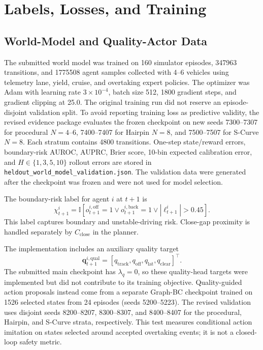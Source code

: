 \documentclass[journal]{IEEEtran}
\begin{document}
\section{Labels, Losses, and Training}
\label{supp:training}

\subsection{World-Model and Quality-Actor Data}
\label{supp:wm_training}

The submitted world model was trained on 160 simulator episodes,
347963 transitions, and 1775508 agent samples collected with 4--6
vehicles using telemetry lane, yield, cruise, and overtaking expert
policies. The optimizer was Adam with learning rate $3\times10^{-4}$,
batch size 512, 1800 gradient steps, and gradient clipping at 25.0.
The original training run did not reserve an episode-disjoint
validation split. To avoid reporting training loss as predictive
validity, the revised evidence package evaluates the frozen checkpoint
on new seeds 7300--7307 for procedural $N=4$--6, 7400--7407 for
Hairpin $N=8$, and 7500--7507 for S-Curve $N=8$. Each stratum contains
4800 transitions. One-step state/reward errors, boundary-risk AUROC,
AUPRC, Brier score, 10-bin expected calibration error, and
$H\in\{1,3,5,10\}$ rollout errors are stored in
\texttt{heldout\_world\_model\_validation.json}. The validation data
were generated after the checkpoint was frozen and were not used for
model selection.

The boundary-risk label for agent $i$ at $t+1$ is
\begin{equation}
\chi_{t+1}^i
=
\mathbb{I}
[
o_{t+1}^{i,\mathrm{off}}=1
\vee
o_{t+1}^{i,\mathrm{back}}=1
\vee
|\ell_{t+1}^i|>0.45
].
\end{equation}
This label captures boundary and unstable-driving risk. Close-gap
proximity is handled separately by $C_{\mathrm{close}}$ in the planner.

The implementation includes an auxiliary quality target
\begin{equation}
\mathbf q_{t+1}^{i,\mathrm{qual}}
=
[
q_{\mathrm{track}},
q_{\mathrm{off}},
q_{\mathrm{lat}},
q_{\mathrm{clear}}
]^\top .
\end{equation}
The submitted main checkpoint has
$\lambda_q=0$, so these quality-head targets were implemented but did
not contribute to its training objective. Quality-guided action
proposals instead come from a separate Graph-BC checkpoint trained on
1526 selected states from 24 episodes (seeds 5200--5223). The revised
validation uses disjoint seeds 8200--8207, 8300--8307, and 8400--8407
for the procedural, Hairpin, and S-Curve strata, respectively. This
test measures conditional action imitation on states selected around
accepted overtaking events; it is not a closed-loop safety metric.
\end{document}
